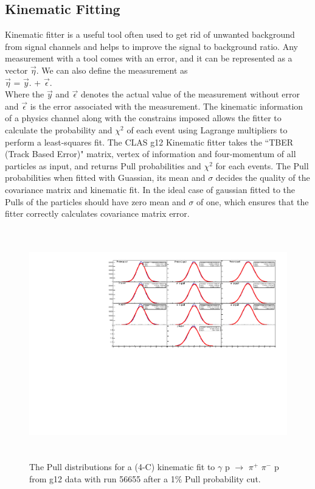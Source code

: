 \subsection{Kinematic Fitting}
\label{KF}
Kinematic fitter is a useful tool often used to get rid of unwanted background from signal channels and helps to improve the signal to background ratio.  Any measurement with a tool comes with an error, and it can be represented as a vector  $\vec{\eta}$. We can also define the measurement as 
\\ $\vec{\eta}$ =  $\vec{y}$. +  $\vec{\epsilon}$.\\
Where the $\vec{y}$ and $\vec{\epsilon}$ denotes the actual value of the measurement without error and $\vec{\epsilon}$ is the error associated with the measurement. The kinematic information of a physics channel along with the constrains imposed allows the fitter to calculate the probability and $\chi^{2}$ of each event using Lagrange multipliers to perform a least-squares fit. The CLAS g12 Kinematic fitter takes the ``TBER (Track Based Error)" matrix, vertex of information and four-momentum of all particles as input, and returns Pull probabilities and $\chi^{2}$ for each events. The Pull probabilities when fitted with Guassian, its mean and $\sigma$ decides the quality of the covariance matrix and kinematic fit. In the ideal case of gaussian fitted to the Pulls of the particles should have  zero mean and $\sigma$ of one, which ensures that the fitter correctly calculates covariance matrix error. 
  
\begin{figure}[ht!]
\centerline{
\includegraphics[width=12cm,height=10cm]{Pulls_nothing.pdf}}
\caption{The Pull distributions for a (4-C) kinematic fit to $\gamma$ p $\rightarrow$ $\pi^{+}$ $\pi^{-}$ p from g12 data with run 56655 after a 1$\%$ Pull probability cut.}
\label{Fig3}
\end{figure}

